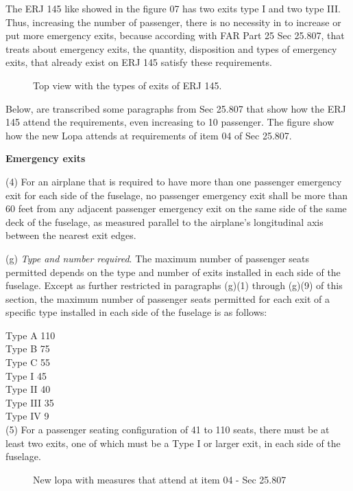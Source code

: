 ﻿The ERJ 145 like showed in the figure 07 has two exits type I and two type III. Thus, increasing the number of passenger, there is no necessity in to increase or put more emergency exits, because according with FAR Part 25 Sec 25.807, that treats about emergency exits, the quantity, disposition and types of emergency exits, that already exist on ERJ 145 satisfy these requirements.

\begin{figure}[H]
\caption{Top view with the types of exits of ERJ 145.}
\label{fig:145-exits}
\end{figure}


Below, are transcribed some paragraphs from Sec 25.807 that show how the ERJ 145 attend the requirements, even increasing to 10 passenger. The figure  show how the new Lopa attends at requirements of item 04 of Sec 25.807.

\textbf{Emergency exits}

(4) For an airplane that is required to have more than one passenger emergency exit for each side of the fuselage, no passenger emergency exit shall be more than 60 feet from any adjacent passenger emergency exit on the same side of the same deck of the fuselage, as measured parallel to the airplane's longitudinal axis between the nearest exit edges.


(g) \emph{Type and number required}. The maximum number of passenger seats permitted depends on the type and number of exits installed in each side of the fuselage. Except as further restricted in paragraphs (g)(1) through (g)(9) of this section, the maximum number of passenger seats permitted for each exit of a specific type installed in each side of the fuselage is as follows:

Type A 110\\
Type B 75\\
Type C 55\\
Type I 45\\
Type II 40\\
Type III 35\\
Type IV 9\\

(5) For a passenger seating configuration of 41 to 110 seats, there must be at least two exits, one of which must be a Type I or larger exit, in each side of the fuselage.


\begin{figure}[H]
\caption{New lopa with measures that attend at item 04 - Sec 25.807}
\label{fig:lopameasuresevacuation}
\end{figure}


